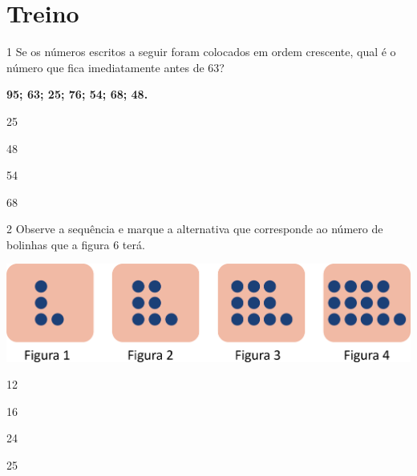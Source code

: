 \pagebreak

\section*{Treino}

\num{1} Se os números escritos a seguir foram colocados em ordem crescente, qual
é o número que fica imediatamente antes de 63?

\begin{myquote}
\centering
\textbf{95; 63; 25; 76; 54; 68; 48.}
\end{myquote}

\begin{escolha}
\begin{multicols}{2}
\item 25

\item 48
\end{multicols}


\begin{multicols}{2}
\item 54

\item 68
\end{multicols}
\end{escolha}

\num{2} Observe a sequência e marque a alternativa que corresponde ao número de bolinhas que a figura 6 terá.

\vspace{1em}


\includegraphics[width=.7\textwidth]{./media/image32.png}


\begin{escolha}

\begin{multicols}{2}

\item 12

\item 16
\end{multicols}


\begin{multicols}{2}

\item 24

\item 25
\end{multicols}
\end{escolha}

